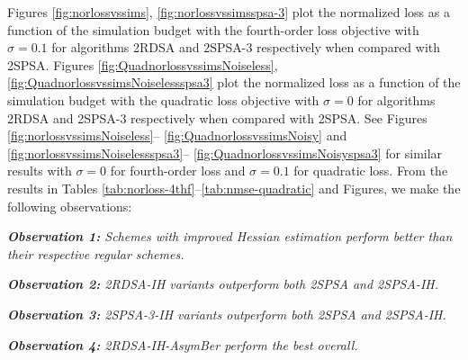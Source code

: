  Figures \ref{fig:norlossvssims}, \ref{fig:norlossvssimsspsa-3} plot the normalized loss as a function of the simulation budget with the fourth-order loss objective with $\sigma=0.1$ for algorithms 2RDSA and 2SPSA-3 respectively when compared with 2SPSA. Figures \ref{fig:QuadnorlossvssimsNoiseless}, \ref{fig:QuadnorlossvssimsNoiselessspsa3} plot the normalized loss as a function of the simulation budget with the quadratic loss objective with $\sigma=0$ for algorithms 2RDSA and 2SPSA-3 respectively when compared with 2SPSA. See Figures \ref{fig:norlossvssimsNoiseless}-- \ref{fig:QuadnorlossvssimsNoisy} and \ref{fig:norlossvssimsNoiselessspsa3}-- \ref{fig:QuadnorlossvssimsNoisyspsa3} for similar results with $\sigma = 0$ for fourth-order loss and $\sigma=0.1$ for quadratic loss. 
 From the results in Tables \ref{tab:norloss-4thf}--\ref{tab:nmse-quadratic} and Figures, we make the following observations:
 
 \textit{\textbf{Observation 1:} Schemes with improved Hessian estimation perform better than their respective regular schemes.}
 
\textit{\textbf{Observation 2:} 2RDSA-IH variants outperform both 2SPSA and 2SPSA-IH.}

\textit{\textbf{Observation 3:} 2SPSA-3-IH variants outperform both 2SPSA and 2SPSA-IH.}

\textit{\textbf{Observation 4:} 2RDSA-IH-AsymBer perform the best overall.}





